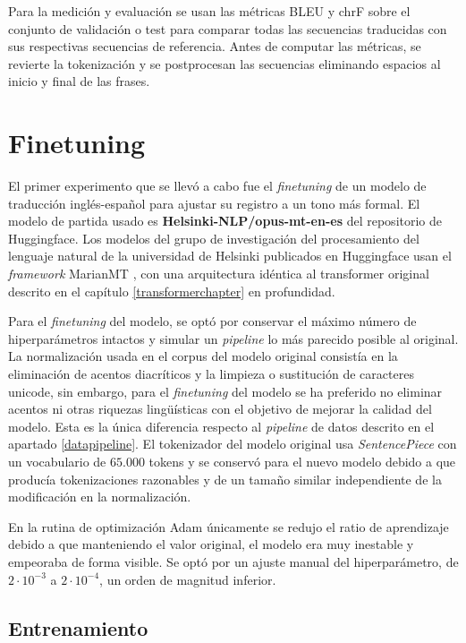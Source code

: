 Para la medición y evaluación se usan las métricas BLEU y chrF sobre el conjunto de validación o test para comparar todas las secuencias traducidas con sus respectivas secuencias de referencia. Antes de computar las métricas, se revierte la tokenización y se postprocesan las secuencias eliminando espacios al inicio y final de las frases.

\section{Finetuning}
El primer experimento que se llevó a cabo fue el \textit{finetuning} de un modelo de traducción inglés-español para ajustar su registro a un tono más formal.
El modelo de partida usado es \textbf{Helsinki-NLP/opus-mt-en-es} del repositorio de Huggingface.
Los modelos del grupo de investigación del procesamiento del lenguaje natural de la universidad de Helsinki publicados en Huggingface usan el \textit{framework} MarianMT \cite{Junczys-Dowmunt2018Apr}, con una arquitectura idéntica al transformer original descrito en el capítulo \ref{transformerchapter} en profundidad.

Para el \textit{finetuning} del modelo, se optó por conservar el máximo número de hiperparámetros intactos y simular un \textit{pipeline} lo más parecido posible al original.
La normalización usada en el corpus del modelo original consistía en la eliminación de acentos diacríticos y la limpieza o sustitución de caracteres unicode, sin embargo, para el \textit{finetuning} del modelo se ha preferido no eliminar acentos ni otras riquezas ling{\"u}ísticas con el objetivo de mejorar la calidad del modelo. Esta es la única diferencia respecto al \textit{pipeline} de datos descrito en el apartado \ref{datapipeline}.
El tokenizador del modelo original usa \textit{SentencePiece} con un vocabulario de $65.000$ tokens y se conservó para el nuevo modelo debido a que producía tokenizaciones razonables y de un tamaño similar independiente de la modificación en la normalización.

En la rutina de optimización Adam \cite{Kingma2014Dec} únicamente se redujo el ratio de aprendizaje debido a que manteniendo el valor original, el modelo era muy inestable y empeoraba de forma visible. Se optó por un ajuste manual del hiperparámetro, de $2\cdot 10^{-3}$ a $2\cdot 10^{-4}$, un orden de magnitud inferior.

\subsection{Entrenamiento}
